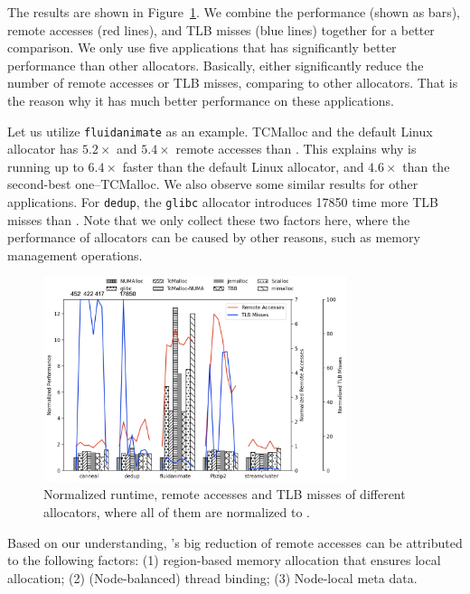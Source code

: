 The results are shown in Figure~\ref{fig:remoteAccess}. We combine the performance (shown as bars), remote accesses (red lines), and TLB misses (blue lines) together for a better comparison. We only use five applications that \NM{} has significantly better performance than other allocators.  Basically, \NM{} either significantly reduce the number of remote accesses or TLB misses, comparing to other allocators. That is the reason why it has much better performance on these applications. 

Let us utilize \texttt{fluidanimate} as an example. TCMalloc and the default Linux allocator has  $5.2\times$ and $5.4\times$ remote accesses than \NM{}. This explains why \NM{} is running up to $6.4\times$ faster than the default Linux allocator, and  $4.6\times$ than the second-best one--TCMalloc. We also observe some similar results for other applications. For \texttt{dedup}, the \texttt{glibc} allocator introduces 17850 time more TLB misses than \NM{}. Note that we only collect these two factors here, where the performance of allocators can be caused by other reasons, such as memory management operations.  


\begin{figure}[!h]
    \centering
    \includegraphics[width=3.5in]{figure/remote-access-and-tlb-miss.jpg}
    \caption{Normalized runtime, remote accesses and TLB misses of different allocators, where all of them are normalized to \NM{}. }
    \label{fig:remoteAccess}
\end{figure}

Based on our understanding, \NM{}'s big reduction of remote accesses can be attributed to the following factors: (1) region-based memory allocation that ensures local allocation; (2) (Node-balanced) thread binding; (3) Node-local meta data. 


